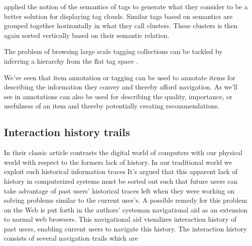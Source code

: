 \citet[]{hassan06} applied the notion of the semantics of tags to
generate what they consider to be a better solution for displaying tag clouds.
Similar tags based on semantics are grouped together horizontally in what they
call clusters. These clusters is then again sorted vertically based on their
semantic relation.

The problem of browsing large scale tagging collections can be tackled by
inferring a hierarchy%
from the flat tag space \citep[]{li07}.

\parabreak

We've seen that item annotation or tagging can be used to annotate items for
describing the information they convey and
thereby afford navigation. As we'll see in
annotations can also be used for describing the quality, importance, or
usefulness of an item and thereby potentially creating recommendations.

\subsection{Interaction history trails}
\label{section:background.social.navigation.applied.forms.interaction.history}

In their classic article \citet{wexelblat99} contrasts the digital world of
computers with our physical world with respect to the formers lack of history.
In our traditional world we exploit such historical information traces
It's argued that this apparent lack of history in computerized systems must
be sorted out such that future users can take advantage
of past users' historical traces left when they were working
on solving problems similar to the current user's.
A possible remedy for this problem on the Web is put forth in the authors'
 system\dash{}an navigational aid as an extension to
normal web browsers. This navigational aid visualizes interaction history of
past users, enabling current users to navigate this history.
The interaction history consists of several navigation trails which are

